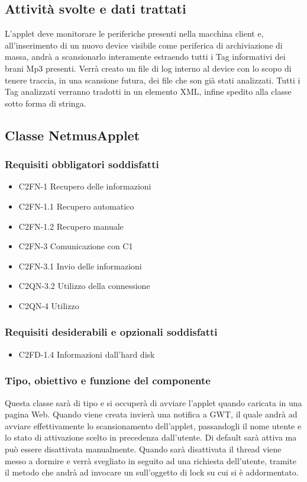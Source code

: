 \subsection*{Attivit\`a svolte e dati trattati}
L'applet deve monitorare le periferiche presenti nella macchina client e,
all'inserimento di un nuovo device visibile come periferica di archiviazione di
massa, andr\`a a scansionarlo interamente estraendo tutti i Tag informativi dei
brani Mp3 presenti. Verr\`a creato un file di log interno al device con lo scopo
di tenere traccia, in una scansione futura, dei file che son gi\`a stati
analizzati. Tutti i Tag analizzati verranno tradotti in un elemento XML, infine
spedito alla classe  sotto forma di stringa.\\

\subsection{Classe NetmusApplet}
\subsubsection*{Requisiti obbligatori soddisfatti}
\begin{itemize}
   \item C2FN-1 Recupero delle informazioni
   \item C2FN-1.1 Recupero automatico
   \item C2FN-1.2 Recupero manuale
   \item C2FN-3 Comunicazione con C1
   \item C2FN-3.1 Invio delle informazioni
   \item C2QN-3.2 Utilizzo della connessione
   \item C2QN-4 Utilizzo
\end{itemize}
\subsubsection*{Requisiti desiderabili e opzionali soddisfatti}
\begin{itemize}
   \item C2FD-1.4 Informazioni dall'hard disk
\end{itemize}
\subsubsection*{Tipo, obiettivo e funzione del componente}
Questa classe sar\`a di tipo  e si occuper\`a di avviare l'applet
quando caricata in una pagina Web. Quando viene creata invier\`a una notifica a
GWT, il quale andr\`a ad avviare effettivamente lo scansionamento dell'applet,
passandogli il nome utente e lo stato di attivazione scelto in precedenza
dall'utente. Di default sar\`a attiva ma pu\`o essere disattivata manualmente.
Quando sar\`a disattivata il thread  viene messo a dormire e verr\`a
svegliato in seguito ad una richiesta dell'utente, tramite il metodo
 che andr\`a ad invocare un  sull'oggetto di lock su
cui  si \`e addormentato.

